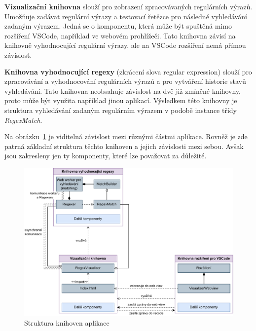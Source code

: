 \textbf{Vizualizační knihovna} slouží pro zobrazení zpracovávaných regulárních výrazů.
Umožňuje zadávat regulární výrazy a testovací řetězce pro následné vyhledávání zadaným výrazem.
Jedná se o komponentu, která může být spuštěná mimo rozšíření VSCode, například ve webovém prohlížeči.
Tato knihovna závisí na knihovně vyhodnocující regulární výrazy, ale na VSCode rozšíření nemá přímou závislost.

\textbf{Knihovna vyhodnocující regexy} (zkrácení slova regular expression) slouží pro zpracovávání a vyhodnocování regulárních výrazů a pro vytváření historie stavů vyhledávání.
Tato knihovna neobsahuje závislost na dvě již zmíněné knihovny, proto může být využita například jinou aplikací.
Výsledkem této knihovny je struktura vyhledávání zadaným regulárním výrazem v podobě instance třídy \textit{RegexMatch}.

Na obrázku~\ref{fig:ARCH} je viditelná závislost mezi různými částmi aplikace. 
Rovněž je zde patrná základní struktura těchto knihoven a jejich závislosti mezi sebou.
Avšak jsou zakresleny jen ty komponenty, které lze považovat za důležité. 

\begin{figure}[!h]
	\centering
	\includegraphics[width=.9\textwidth]{Figures/BP-Arch.pdf}
	\caption{Struktura knihoven aplikace}
	\label{fig:ARCH}
\end{figure}

